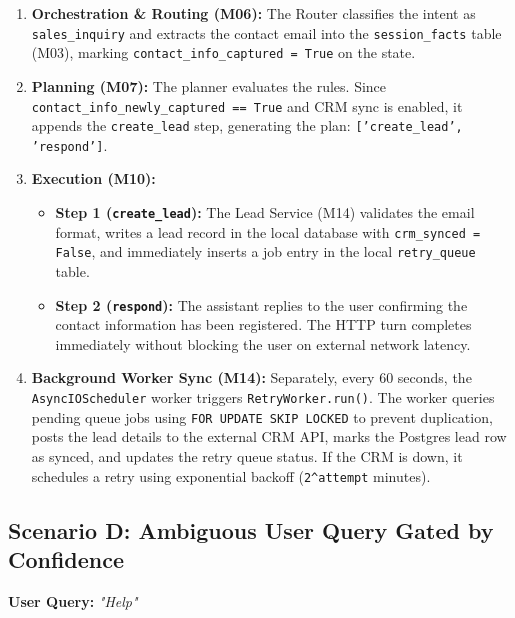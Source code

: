 \documentclass[11pt,a4paper]{article}
\begin{document}
\begin{enumerate}
    \item \textbf{Orchestration \& Routing (M06):} The Router classifies the intent as \texttt{sales_inquiry} and extracts the contact email into the \texttt{session_facts} table (M03), marking \texttt{contact_info_captured = True} on the state.
    \item \textbf{Planning (M07):} The planner evaluates the rules. Since \texttt{contact_info_newly_captured == True} and CRM sync is enabled, it appends the \texttt{create_lead} step, generating the plan: \texttt{['create_lead', 'respond']}.
    \item \textbf{Execution (M10):}
    \begin{itemize}
        \item \textbf{Step 1 (\texttt{create_lead}):} The Lead Service (M14) validates the email format, writes a lead record in the local database with \texttt{crm_synced = False}, and immediately inserts a job entry in the local \texttt{retry_queue} table.
        \item \textbf{Step 2 (\texttt{respond}):} The assistant replies to the user confirming the contact information has been registered. The HTTP turn completes immediately without blocking the user on external network latency.
    \end{itemize}
    \item \textbf{Background Worker Sync (M14):} Separately, every 60 seconds, the \texttt{AsyncIOScheduler} worker triggers \texttt{RetryWorker.run()}. The worker queries pending queue jobs using \texttt{FOR UPDATE SKIP LOCKED} to prevent duplication, posts the lead details to the external CRM API, marks the Postgres lead row as synced, and updates the retry queue status. If the CRM is down, it schedules a retry using exponential backoff (\texttt{2^attempt} minutes).
\end{enumerate}

\subsection{Scenario D: Ambiguous User Query Gated by Confidence}
\textbf{User Query:} \textit{"Help"}
\end{document}
